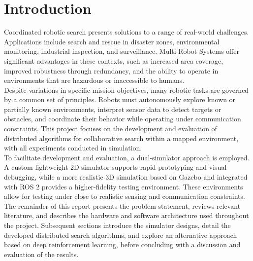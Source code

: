 \section{Introduction}
\label{sec:Introduction}
Coordinated robotic search presents solutions to a range of real-world challenges. Applications include search and rescue in disaster zones, environmental monitoring, industrial inspection, and surveillance. 
Multi-Robot Systems offer significant advantages in these contexts, such as increased area coverage, improved robustness through redundancy, and the ability to operate in environments that are hazardous or inaccessible to humans. \\

Despite variations in specific mission objectives, many robotic tasks are governed by a common set of principles. 
Robots must autonomously explore known or partially known environments, interpret sensor data to detect targets or obstacles, and coordinate their behavior while operating under communication constraints. 
This project focuses on the development and evaluation of distributed algorithms for collaborative search within a mapped environment, with all experiments conducted in simulation. \\

To facilitate development and evaluation, a dual-simulator approach is employed. 
A custom lightweight 2D simulator supports rapid prototyping and visual debugging, while a more realistic 3D simulation based on Gazebo and integrated with ROS 2 provides a higher-fidelity testing environment. 
These environments allow for testing under close to realistic sensing and communication constraints. \\

The remainder of this report presents the problem statement, reviews relevant literature, and describes the hardware and software architecture used throughout the project. 
Subsequent sections introduce the simulator designs, detail the developed distributed search algorithms, and explore an alternative approach based on deep reinforcement learning, before concluding with a discussion and evaluation of the results.
